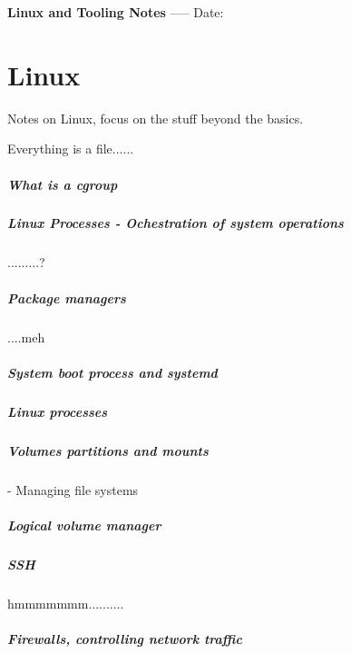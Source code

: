 \documentclass[a4paper, 11pt]{book}
\begin{document}
    \begin{titlepage}
        \centering
        \vspace*{2in}
        \Huge \textbf{Linux and Tooling Notes}
        \vfill
        \Large -----
        \vfill
        \Large Date:%
    \end{titlepage}

    \tableofcontents
    \newpage

    \chapter{Linux}
    Notes on Linux, focus on the stuff beyond the basics.

    Everything is a file......

    \paragraph{What is a cgroup}


    \paragraph{Linux Processes - Ochestration of system operations}
    .........?
    \paragraph{Package managers}
    ....meh
    \paragraph{System boot process and systemd}
    \paragraph{Linux processes}
    \paragraph{Volumes partitions and mounts} - Managing file systems
    \paragraph{Logical volume manager}
    \paragraph{SSH}
    hmmmmmmm..........
    \paragraph{Firewalls, controlling network traffic}
\end{document}
